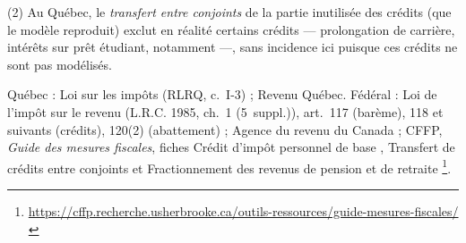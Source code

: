 (2) Au Québec, le \emph{transfert entre conjoints} de la partie inutilisée
des crédits (que le modèle reproduit) exclut en réalité certains crédits
--- prolongation de carrière, intérêts sur prêt étudiant, notamment ---,
sans incidence ici puisque ces crédits ne sont pas modélisés.



\prefs Québec : Loi sur les impôts (RLRQ, c.~I-3) ; Revenu Québec.
Fédéral : Loi de l'impôt sur le revenu (L.R.C. 1985, ch.~1
(5\ieme{}~suppl.)), art.~117 (barème), 118 et suivants (crédits), 120(2)
(abattement) ; Agence du revenu du Canada ; CFFP, \emph{Guide des mesures
fiscales}, fiches \og Crédit d'impôt personnel de base \fg{}, \og Transfert
de crédits entre conjoints \fg{} et \og Fractionnement des revenus de
pension et de retraite \fg{}\footnote{\url{https://cffp.recherche.usherbrooke.ca/outils-ressources/guide-mesures-fiscales/}}.
